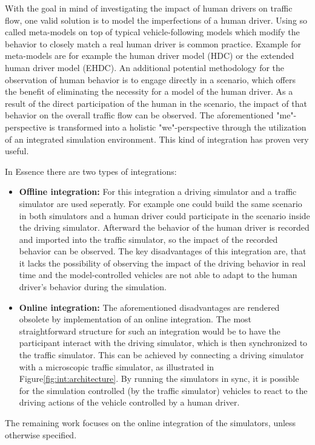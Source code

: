         With the goal in mind of investigating the impact of human drivers on traffic flow, one valid solution is to model the imperfections of a human driver.
        Using  so called meta-models on top of  typical vehicle-following models which modify the behavior to closely match a real human driver is common practice.
        Example for meta-models are for example the human driver model (HDC)\cite{treiber2006delays} or the extended human driver model (EHDC)\cite{Lindorfer2018}.
        An additional potential methodology for the observation of human behavior is to engage directly in a scenario, which offers the benefit of eliminating the necessity for a model of the human driver.
        As a result of the direct participation of the human in the scenario, the impact of that behavior on the overall traffic flow can be observed.
        The aforementioned "me"-perspective is transformed into a holistic "we"-perspective through the utilization of an integrated simulation environment.
        This kind of integration has proven very useful\cite{punzo2010integration}.

        In Essence there are two types of integrations:
        \begin{itemize}
            \item \textbf{Offline integration:} For this integration a driving simulator and a traffic simulator are used seperatly.
            For example one could build the same scenario in both simulators and a human driver could participate in the scenario inside the driving simulator.
            Afterward the behavior of the human driver is recorded and imported into the traffic simulator, so the impact of the recorded behavior can be observed.
            The key disadvantages of this integration are, that it lacks the possibility of observing the impact of the driving behavior in real time and the model-controlled vehicles are not able to adapt to the human driver's behavior during the simulation.
            \item \textbf{Online integration:} The aforementioned disadvantages are rendered obsolete by implementation of an online integration.
            The most straightforward structure for such an integration would be to have the participant interact with the driving simulator, which is then synchronized to the traffic simulator.
            This can be achieved by connecting a driving simulator with a microscopic traffic simulator, as illustrated in Figure\ref{fig:int:architecture}.
            By running the simulators in sync, it is possible for the simulation controlled (by the traffic simulator) vehicles to react to the driving actions of the vehicle controlled by a human driver.
        \end{itemize}
        The remaining work focuses on the online integration of the simulators, unless otherwise specified.

